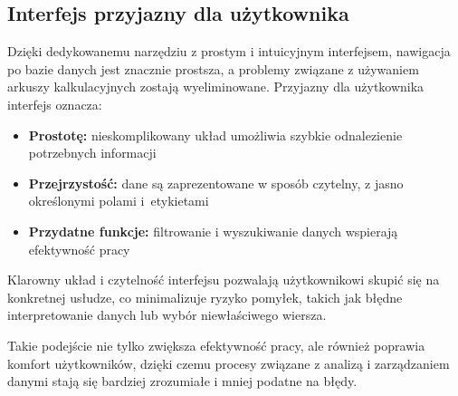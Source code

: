 \subsection{Interfejs przyjazny dla użytkownika}
\begin{comment}Dedykowane narzędzie z prostym i intuicyjnym interfejsem znacząco ułatwia nawigację po bazie danych, eliminując problemy związane z tradycyjnymi rozwiązaniami, takimi jak arkusze kalkulacyjne. \end{comment}

Dzięki dedykowanemu narzędziu z prostym i intuicyjnym interfejsem, nawigacja po bazie danych jest znacznie prostsza, a problemy związane z używaniem arkuszy kalkulacyjnych zostają wyeliminowane. Przyjazny dla użytkownika interfejs oznacza:
\begin{itemize}
    \item \textbf{Prostotę:} nieskomplikowany układ umożliwia szybkie odnalezienie potrzebnych informacji
    \item \textbf{Przejrzystość:} dane są zaprezentowane w sposób czytelny, z jasno określonymi polami i~etykietami
    \item \textbf{Przydatne funkcje:} filtrowanie i wyszukiwanie danych wspierają efektywność pracy
\end{itemize}
Klarowny układ i czytelność interfejsu pozwalają użytkownikowi skupić się na konkretnej usłudze, co minimalizuje ryzyko pomyłek, takich jak błędne interpretowanie danych lub wybór niewłaściwego wiersza.

Takie podejście nie tylko zwiększa efektywność pracy, ale również poprawia komfort użytkowników, dzięki czemu procesy związane z analizą i zarządzaniem danymi stają się bardziej zrozumiałe i mniej podatne na błędy.